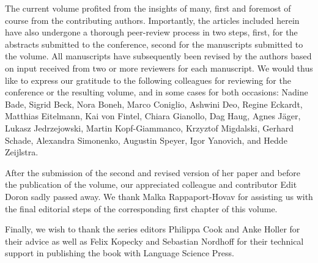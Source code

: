 \begin{refsection}

The current volume profited from the insights of many, first and foremost of course from the contributing authors. Importantly, the articles included herein have also undergone a thorough peer-review process in two steps, first, for the abstracts submitted to the conference, second for the manuscripts submitted to the volume. All manuscripts have subsequently been revised by the authors based on input received from two or more reviewers for each manuscript. We would thus like to express our gratitude to the following colleagues for reviewing for the conference or the resulting volume, and in some cases for both occasions: Nadine Bade, Sigrid Beck, Nora Boneh, Marco Coniglio, Ashwini Deo, Regine Eckardt, Matthias Eitelmann, Kai von Fintel, Chiara Gianollo, Dag Haug, Agnes Jäger, Lukasz Jedrzejowski, Martin Kopf-Giammanco, Krzyztof Migdalski, Gerhard Schade, Alexandra Simonenko, Augustin Speyer, Igor Yanovich, and Hedde Zeijlstra. 

After the submission of the second and revised version of her paper and before the publication of the volume, our appreciated colleague and contributor Edit Doron sadly passed away. We thank Malka Rappaport-Hovav for assisting us with the final editorial steps of the corresponding first chapter of this volume. 

Finally, we wish to thank the series editors Philippa Cook and Anke Holler for their advice as well as Felix Kopecky and Sebastian Nordhoff for their technical support in publishing the book with Language Science Press.

\end{refsection}

